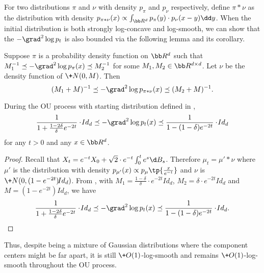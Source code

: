 
For two distributions $\pi$ and $\nu$ with density $p_\pi$ and $p_{\nu}$ respectively, define $\pi*\nu$ as the distribution with density $p_{\pi*\nu}(x)\propto \int_{\bb R^d} p_{\pi}(y)\cdot p_{\nu}(x-y)\dd y$.
When the initial distribution is both strongly log-concave and log-smooth, we can show that the $-\grad^2 \log p_t$ is also bounded via the following lemma and its corollary.
\begin{lemma}\label{lem:m-gaussian1}
      Suppose $\pi$ is a probability density function on $\bb R^d$ such that $M_{1}^{-1} \preceq -\grad^2 \log p_{\pi}(x) \preceq M_2^{-1}$ for some $M_1,M_2\in \bb R^{d\times d}$. Let $\nu$ be the density function of $\+N(0,M)$. Then
      \[
        (M_1+M)^{-1} \preceq  -\grad^2 \log p_{\pi*\nu}(x) \preceq (M_2+M)^{-1}.
      \]
\end{lemma}

\begin{corollary}\label{cor:mixture2}
    During the OU process with starting distribution defined in , 
    \[
        \frac{1}{1+\frac{1-2\delta}{\delta}e^{-2t}}\cdot \!{Id}_d \preceq -\grad^2 \log p_t(x) \preceq \frac{1}{1-(1-\delta)e^{-2t}} \cdot \!{Id}_d
    \]
    for any $t>0$ and any $x\in \bb R^d$.
\end{corollary}
\begin{proof}
    Recall that $X_t = e^{-t}X_0 + \sqrt{2}\cdot e^{-t}\int_{0}^t e^s \d B_s$. Therefore $\mu_t = \mu'*\nu$ where $\mu'$ is the distribution with density $p_{\mu'}(x) \propto p_{\mu}\tp{\frac{x}{e^{-t}}}$ and $\nu$ is $\+N(0,(1-e^{-2t})\!{Id}_d)$. From , with $M_1 = \frac{1-\delta}{\delta}\cdot e^{-2t}\!{Id}_d$, $M_2 = \delta\cdot e^{-2t}\!{Id}_d$ and $M=(1-e^{-2t})\!{Id}_d$, we have 
    \[
        \frac{1}{1+\frac{1-2\delta}{\delta}e^{-2t}}\cdot \!{Id}_d \preceq -\grad^2 \log p_t(x) \preceq \frac{1}{1-(1-\delta)e^{-2t}} \cdot \!{Id}_d.
    \]
\end{proof}

Thus, despite being a mixture of Gaussian distributions where the component centers might be far apart, it is still $\+O(1)$-log-smooth and remains $\+O(1)$-log-smooth throughout the OU process.


